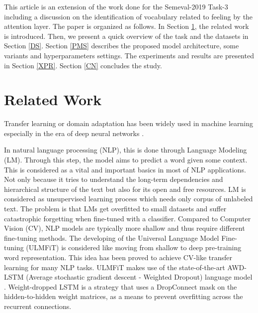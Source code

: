 \documentclass{article}
\begin{document}
This article is an extension of the work done for the Semeval-2019 Task-3  \cite{SemEval2019Task3} including a discussion on the identification of vocabulary related to feeling by the attention layer. The  paper is organized as follows. In Section \ref{RW}, the related work is introduced. Then, we present a quick overview of the task and the datasets in Section \ref{DS}. Section \ref{PMS} describes the proposed model architecture, some variants and hyperparameters settings. The experiments and results are presented in Section \ref{XPR}. Section \ref{CN} concludes the study. 


\section{Related Work}\label{RW}

Transfer learning or domain adaptation has been widely used in machine learning especially in the era of deep neural networks \cite{Goodfellow-et-al-2016}. 
\begin{comment}
It enables reusing the models developed and trained in a source task to another target task. The power of transfer learning is very clear when the features learned from the source or base task are general and can be repurpose to the target tasks. Computer Vision (CV) models are the most common and widely used models that make use of domain adaptation. Nowadays, most of CV models base extracting the feature to a pretrained models like AlexNet, ResNet, MS-COCO ... etc \cite{cvPre}. 
\end{comment}
In natural language processing (NLP), this is done through Language Modeling (LM). Through this step, the model aims to predict a word given some context. This is considered as a vital and important basics in most of NLP applications. Not only because it tries to understand the long-term dependencies and hierarchical structure of the text but also for its open and free resources. LM is considered as unsupervised learning process which needs only corpus of unlabeled text. The problem is that LMs get overfitted to small datasets and suffer catastrophic forgetting when fine-tuned with a classifier. Compared to Computer Vision (CV), NLP models are typically more shallow and thus require different fine-tuning methods. The developing of the Universal Language Model Fine-tuning (ULMFiT) \cite{jerm} is considered like moving from shallow to deep pre-training word representation. This idea has been proved to achieve CV-like transfer learning for many NLP tasks. ULMFiT makes use of  the state-of-the-art AWD-LSTM (Average stochastic gradient descent - Weighted Dropout) language model \cite{meri_1}. Weight-dropped LSTM is a strategy that uses a DropConnect \cite{DropConnect} mask on the hidden-to-hidden weight matrices, as a means to prevent overfitting across the recurrent connections. 
\end{document}
